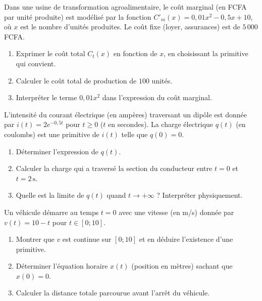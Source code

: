 \documentclass[11pt]{article}
\newcounter{popsec}
\newcounter{popsub}
\newcommand{\courssub}[1]{%
  \stepcounter{popsub}%
  \par\vspace{9pt}\noindent{\popxbold\fontsize{11.5}{13}\selectfont\color{popink}{\color{poporange}\thepopsec.\thepopsub}\hspace{6pt}#1}\par\nopagebreak\vspace{4pt}
}
\begin{document}
\courssub{Je m'entraîne}

\begin{exercice}
Dans une usine de transformation agroalimentaire, le coût marginal (en FCFA par unité produite) est modélisé par la fonction $C'_m(x)=0,01x^2-0,5x+10$, où $x$ est le nombre d'unités produites. Le coût fixe (loyer, assurances) est de $5\,000$ FCFA.
\begin{enumerate}
    \item Exprimer le coût total $C_t(x)$ en fonction de $x$, en choisissant la primitive qui convient.
    \item Calculer le coût total de production de $100$ unités.
    \item Interpréter le terme $0,01x^2$ dans l'expression du coût marginal.
\end{enumerate}
\end{exercice}

\begin{exercice}
L'intensité du courant électrique (en ampères) traversant un dipôle est donnée par $i(t)=2e^{-0,5t}$ pour $t\ge 0$ ($t$ en secondes). La charge électrique $q(t)$ (en coulombs) est une primitive de $i(t)$ telle que $q(0)=0$.
\begin{enumerate}
    \item Déterminer l'expression de $q(t)$.
    \item Calculer la charge qui a traversé la section du conducteur entre $t=0$ et $t=2\,\text{s}$.
    \item Quelle est la limite de $q(t)$ quand $t\to +\infty$ ? Interpréter physiquement.
\end{enumerate}
\end{exercice}

\begin{exercice}
Un véhicule démarre au temps $t=0$ avec une vitesse (en m/s) donnée par $v(t)=10-t$ pour $t\in[0;10]$.
\begin{enumerate}
    \item Montrer que $v$ est continue sur $[0;10]$ et en déduire l'existence d'une primitive.
    \item Déterminer l'équation horaire $x(t)$ (position en mètres) sachant que $x(0)=0$.
    \item Calculer la distance totale parcourue avant l'arrêt du véhicule.
\end{enumerate}
\end{exercice}
\end{document}
